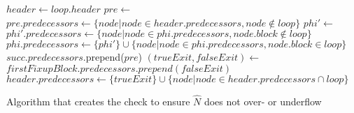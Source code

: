 \begin{algorithm}[H]
    \begin{algorithmic}
            \State $header \gets loop.header$
            \State $pre \gets$ 
            \State $pre.predecessors \gets \{node \vert node \in header.predecessors, node \notin loop\}$
                \State $phi' \gets$ 
                \State $phi'.predecessors \gets \{node \vert node \in phi.predecessors, node.block \notin loop\}$
                \State $phi.predecessors \gets \{phi'\} \cup \{node \vert node \in phi.predecessors, node.block \in loop\}$
                        \State $succ.predecessors$.prepend($pre$)
                    \EndIf
                \EndFor
            \EndFor
            \State $(trueExit, falseExit) \gets$ 
            \State $firstFixupBlock.predecessors.prepend(falseExit)$
            \State $header.predecessors \gets \{trueExit\} \cup \{node \vert node \in header.predecessors \cap loop\}$
        \EndFunction
    \end{algorithmic}
    \caption{Algorithm that creates the check to ensure $\hat{N}$ does not over- or underflow}
    \label{alg:impl:fixup:header-cond:preheader}
\end{algorithm}